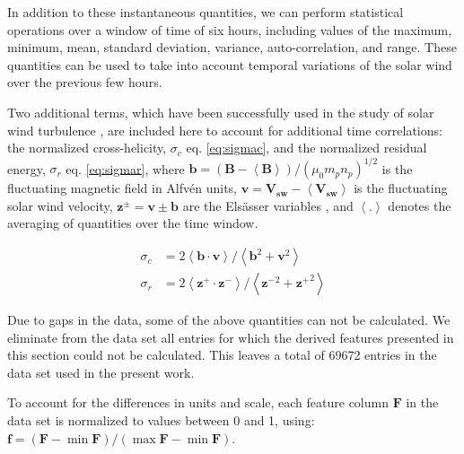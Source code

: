 In addition to these instantaneous quantities, we can perform statistical operations over a window of time of six hours, including values of the maximum, minimum, mean, standard deviation, variance, auto-correlation, and range. These quantities can be used to take into account temporal variations of the solar wind over the previous few hours.

Two additional terms, which have been successfully used in the study of solar wind turbulence \citep{SEE ROBERTS REFS}, are included here to account for additional time correlations: the normalized cross-helicity, $\sigma_c$ eq. \eqref{eq:sigmac}, and the normalized residual energy, $\sigma_r$ eq. \eqref{eq:sigmar}, where $\boldsymbol{b} = \left(\boldsymbol{B}- \boldsymbol{\left<B\right>}\right)/(\mu_0m_pn_p)^{1/2}$ is the fluctuating magnetic field in Alfv\'en units, $\boldsymbol{v} = \boldsymbol{V_{sw}}- \boldsymbol{\left<V_{sw}\right>}$ is the fluctuating solar wind velocity, $\boldsymbol{z^\pm} = \boldsymbol{v} \pm \boldsymbol{b}$ are the Els\"asser variables \citep{Elssaser1950, Magyar2019}, and $\left<.\right>$ denotes the averaging of quantities over the time window.

\begin{align}
\sigma_c & = 2 \left< \boldsymbol{b}\cdot\boldsymbol{v}\right>/\left<\boldsymbol{b}^2 + \boldsymbol{v}^2\right> \label{eq:sigmac} \\
\sigma_r & = 2 \left< \boldsymbol{z^+}\cdot\boldsymbol{z^-}\right>/\left<\boldsymbol{z^-}^2 + \boldsymbol{z^+}^2\right> \label{eq:sigmar}
\end{align}

Due to gaps in the data, some of the above quantities can not be calculated. We eliminate from the data set all entries for which the derived features presented in this section could not be calculated. This leaves a total of 69672 entries in the data set used in the present work.

To account for the differences in units and scale, each feature column $\boldsymbol{F}$ in the data set is normalized to values between 0 and 1, using: $\boldsymbol{f}=\left(\boldsymbol{F}-\min{\boldsymbol{F}}\right) /\left(\max{\boldsymbol{F}}-\min{\boldsymbol{F}}\right)$.


